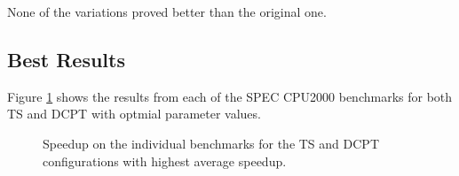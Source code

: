 None of the variations proved better than the original one.

\subsection{Best Results}

Figure \ref{figure:benchmarks-plot} shows the results from each of the SPEC
CPU2000 benchmarks for both TS and DCPT with optmial parameter values.

\begin{figure}[h!]
	\begin{centering}
		
		\caption{Speedup on the individual benchmarks for the TS and DCPT configurations with highest average speedup.}
		\label{figure:benchmarks-plot}
	\end{centering}
\end{figure}

